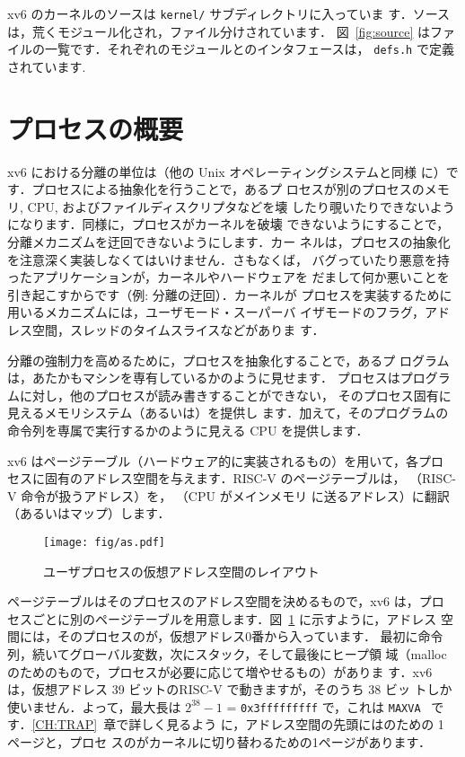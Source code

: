 xv6 のカーネルのソースは \texttt{kernel/} サブディレクトリに入っていま
す．ソースは，荒くモジュール化され，ファイル分けされています．
図~\ref{fig:source} はファイルの一覧です．それぞれのモジュールとのインタフェースは，
\lstinline{defs.h}  で定義されています.

\section{プロセスの概要}

xv6 における分離の単位は（他の Unix オペレーティングシステムと同様
に）です．プロセスによる抽象化を行うことで，あるプ
ロセスが別のプロセスのメモリ, CPU, およびファイルディスクリプタなどを壊
したり覗いたりできないようになります．同様に，プロセスがカーネルを破壊
できないようにすることで，分離メカニズムを迂回できないようにします．カー
ネルは，プロセスの抽象化を注意深く実装しなくてはいけません．さもなくば，
バグっていたり悪意を持ったアプリケーションが，カーネルやハードウェアを
だまして何か悪いことを引き起こすからです（例: 分離の迂回）．カーネルが
プロセスを実装するために用いるメカニズムには，ユーザモード・スーパーバ
イザモードのフラグ，アドレス空間，スレッドのタイムスライスなどがありま
す．

分離の強制力を高めるために，プロセスを抽象化することで，あるプ
ログラムは，あたかもマシンを専有しているかのように見せます．
プロセスはプログラムに対し，他のプロセスが読み書きすることができない，
そのプロセス固有に見えるメモリシステム（あるいは）を提供し
ます．加えて，そのプログラムの命令列を専属で実行するかのように見える
CPU を提供します．

xv6 はページテーブル（ハードウェア的に実装されるもの）を用いて，各プロ
セスに固有のアドレス空間を与えます．RISC-V のページテーブルは，
（RISC-V 命令が扱うアドレス）を，
（CPU がメインメモリ
に送るアドレス）に翻訳（あるいはマップ）します．

\begin{figure}[t]
\centering
\texttt{[image: fig/as.pdf]}
\caption{ユーザプロセスの仮想アドレス空間のレイアウト}
\label{fig:as}
\end{figure}

ページテーブルはそのプロセスのアドレス空間を決めるもので，xv6 は，プロ
セスごとに別のページテーブルを用意します．図~\ref{fig:as} に示すように，アドレス
空間には，そのプロセスのが，仮想アドレス0番から入っています．
最初に命令列，続いてグローバル変数，次にスタック，そして最後にヒープ領
域（malloc のためのもので，プロセスが必要に応じて増やせるもの）がありま
す．xv6 は，仮想アドレス 39 ビットのRISC-V で動きますが，そのうち 38 ビッ
トしか使いません．よって，最大長は $2^{38}-1$ = \texttt{0x3fffffffff}
で，これは \lstinline{MAXVA}~ です．\ref{CH:TRAP}~章で詳しく見るよう
に，アドレス空間の先頭にはのための 1 ページと，プロセ
スのがカーネルに切り替わるための1ページがあります．

